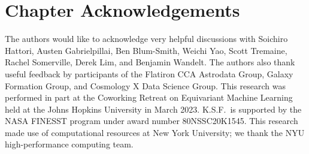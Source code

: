 \section{Chapter Acknowledgements}
The authors would like to acknowledge very helpful discussions with Soichiro Hattori, Austen Gabrielpillai, Ben Blum-Smith, Weichi Yao, Scott Tremaine, Rachel Somerville, Derek Lim, and Benjamin Wandelt.
The authors also thank useful feedback by participants of the Flatiron CCA Astrodata Group, Galaxy Formation Group, and Cosmology X Data Science Group.
This research was performed in part at the Coworking Retreat on Equivariant Machine Learning held at the Johns Hopkins University in March 2023.
K.S.F.~is supported by the NASA FINESST program under award number 80NSSC20K1545.
This research made use of computational resources at New York University; we thank the NYU high-performance computing team.